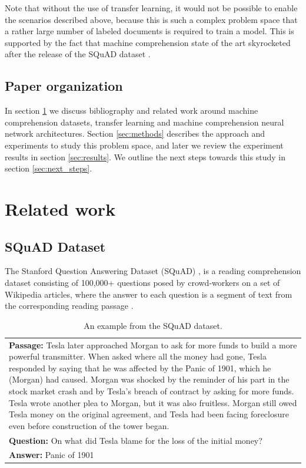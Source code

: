 \documentclass[11pt,a4paper]{article}
\begin{document}
Note that without the use of transfer learning, it would not be possible to enable the scenarios described above, because this is such a complex problem space that a rather large number of labeled documents is required to train a model. This is supported by the fact that machine comprehension state of the art skyrocketed after the release of the SQuAD dataset \cite{rnet} \cite{bidaf:2017}. 

\subsection{Paper organization}

In section \ref{sec:related_work} we discuss bibliography and related work around machine comprehension datasets, transfer learning and machine comprehension neural network architectures. Section \ref{sec:methods} describes the approach and experiments to study this problem space, and later we review the experiment results in section \ref{sec:results}. We outline the next steps towards this study in section \ref{sec:next_steps}.  


\section{Related work}
\label{sec:related_work}


\subsection{SQuAD Dataset}
\label{ssec:squad}

The Stanford Question Answering Dataset (SQuAD) \cite{rnet}, is a reading comprehension dataset consisting of 100,000+ questions posed by crowd-workers on a set of Wikipedia articles, where the answer to each question is a segment of text from the corresponding reading passage \cite{squad:2016}.

\begin{table}
\centering
\begin{tabular}{|p{7cm}|}
 \hline
\textbf{Passage:} Tesla later approached Morgan to ask for more funds to build a more powerful transmitter. When asked where all the money had gone, Tesla responded by saying that he was affected by the Panic of 1901, which he (Morgan) had caused. Morgan was shocked by the reminder of his part in the stock market crash and by Tesla’s breach of contract by asking for more funds. Tesla wrote another plea to Morgan, but it was also fruitless. Morgan still owed Tesla money on the original agreement, and Tesla had been facing foreclosure even before construction of the tower began.\\ 
\textbf{Question:} On what did Tesla blame for the loss of the initial money?\\
\textbf{Answer:} Panic of 1901\\
 \hline
\end{tabular}
\caption{An example from the SQuAD dataset.
  }
\end{table}
\end{document}
